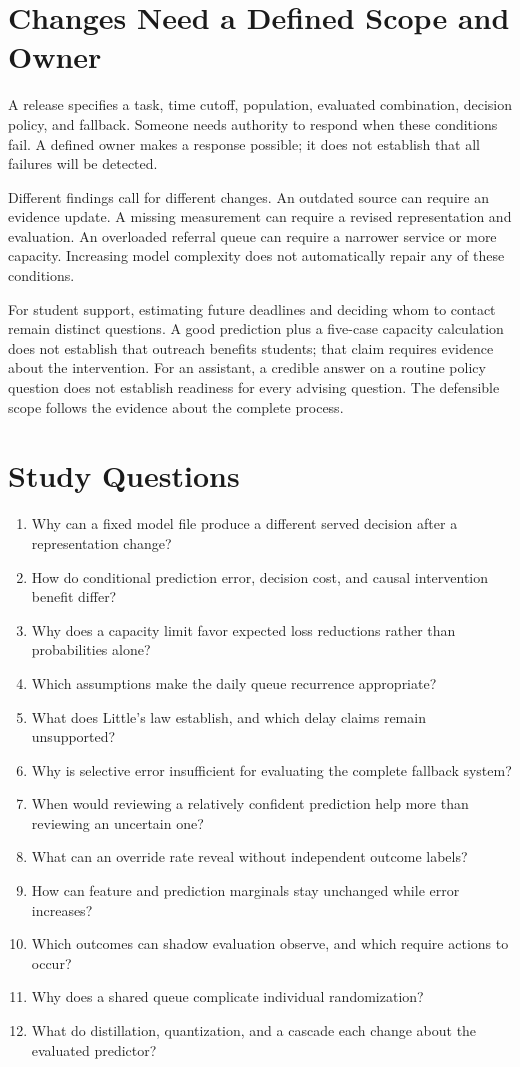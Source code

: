 \section{Changes Need a Defined Scope and Owner}

A release specifies a task, time cutoff, population, evaluated combination, decision policy, and fallback. Someone needs authority to respond when these conditions fail. A defined owner makes a response possible; it does not establish that all failures will be detected.

Different findings call for different changes. An outdated source can require an evidence update. A missing measurement can require a revised representation and evaluation. An overloaded referral queue can require a narrower service or more capacity. Increasing model complexity does not automatically repair any of these conditions.

For student support, estimating future deadlines and deciding whom to contact remain distinct questions. A good prediction plus a five-case capacity calculation does not establish that outreach benefits students; that claim requires evidence about the intervention. For an assistant, a credible answer on a routine policy question does not establish readiness for every advising question. The defensible scope follows the evidence about the complete process.

\section{Study Questions}

\begin{enumerate}
\item Why can a fixed model file produce a different served decision after a representation change?
\item How do conditional prediction error, decision cost, and causal intervention benefit differ?
\item Why does a capacity limit favor expected loss reductions rather than probabilities alone?
\item Which assumptions make the daily queue recurrence appropriate?
\item What does Little's law establish, and which delay claims remain unsupported?
\item Why is selective error insufficient for evaluating the complete fallback system?
\item When would reviewing a relatively confident prediction help more than reviewing an uncertain one?
\item What can an override rate reveal without independent outcome labels?
\item How can feature and prediction marginals stay unchanged while error increases?
\item Which outcomes can shadow evaluation observe, and which require actions to occur?
\item Why does a shared queue complicate individual randomization?
\item What do distillation, quantization, and a cascade each change about the evaluated predictor?
\end{enumerate}

